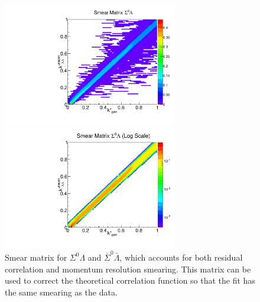 \begin{figure}[h]
\begin{minipage}{18pc}
\includegraphics[width=18pc]{Figures/SmearMatrices/2016-7-19-SmearMatrixSigmaLambdaNormLLAA.pdf}
\end{minipage}\hspace{2pc}
\begin{minipage}{18pc}
\includegraphics[width=18pc]{Figures/SmearMatrices/2016-7-19-SmearMatrixSigmaLambdaNormLLAALog.pdf}
\end{minipage} 
\caption[Smear matrix -- $\Sigma^0\Lambda$ and $\bar{\Sigma}^0\bar{\Lambda}$]{ 
Smear matrix for $\Sigma^0\Lambda$ and $\bar{\Sigma}^0\bar{\Lambda}$, which accounts for both residual correlation and momentum resolution smearing. This matrix can be used to correct the theoretical correlation function so that the fit has the same smearing as the data.
}
\end{figure}

